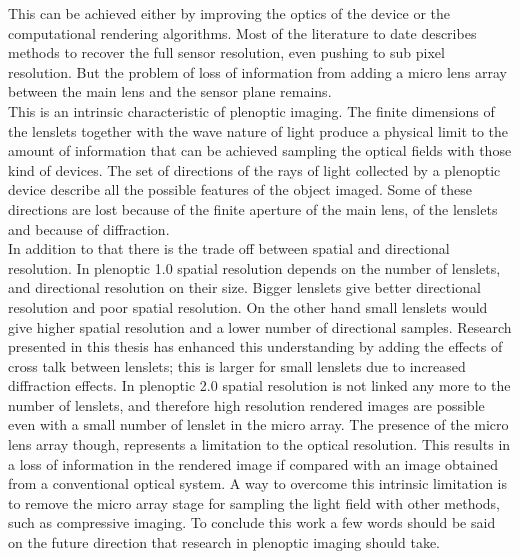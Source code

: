 This can be achieved either by improving the optics of the device or the computational rendering algorithms. Most of the literature to date describes methods to recover the full sensor resolution, even pushing to sub pixel resolution. But the problem of loss of information from adding a micro lens array between the main lens and the sensor plane remains. 
\\
This is an intrinsic characteristic of plenoptic imaging. The finite dimensions of the lenslets together with the wave nature of light produce a physical limit to the amount of information that can be achieved sampling the optical fields with those kind of devices. The set of directions of the rays of light collected by a plenoptic device describe all the possible features of the object imaged. Some of these directions are lost because of the finite aperture of the main lens, of the lenslets and because of diffraction. 
\\
In addition to that there is the trade off between spatial and directional resolution. In plenoptic 1.0 spatial resolution depends on the number of lenslets, and directional resolution on their size. Bigger lenslets give better directional resolution and poor spatial resolution. On the other hand small lenslets would give higher spatial resolution and a lower number of directional samples. Research presented in this thesis has enhanced this understanding by adding the effects of cross talk between lenslets; this is larger for small lenslets due to increased diffraction effects. In plenoptic 2.0 spatial resolution is not linked any more to the number of lenslets, and therefore high resolution rendered images are possible even with a small number of lenslet in the micro array. The presence of the micro lens array though, represents a limitation to the optical resolution. This results in a loss of information in the rendered image if compared with an image obtained from a conventional optical system. A way to overcome this intrinsic limitation is to remove the micro array stage for sampling the light field with other methods, such as compressive imaging.
To conclude this work a few words should be said on the future direction that research in plenoptic imaging should take. \\
